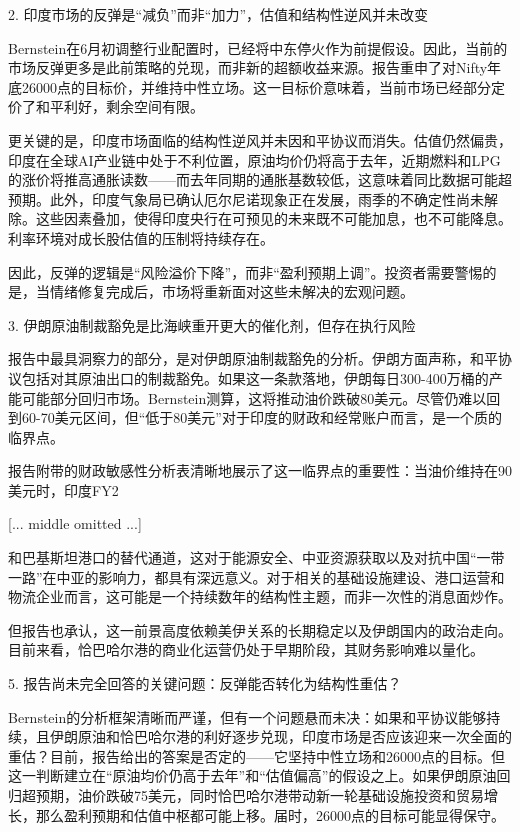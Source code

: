 \documentclass[11pt]{ctexart}
\begin{document}
2. 印度市场的反弹是“减负”而非“加力”，估值和结构性逆风并未改变

Bernstein在6月初调整行业配置时，已经将中东停火作为前提假设。因此，当前的市场反弹更多是此前策略的兑现，而非新的超额收益来源。报告重申了对Nifty年底26000点的目标价，并维持中性立场。这一目标价意味着，当前市场已经部分定价了和平利好，剩余空间有限。

更关键的是，印度市场面临的结构性逆风并未因和平协议而消失。估值仍然偏贵，印度在全球AI产业链中处于不利位置，原油均价仍将高于去年，近期燃料和LPG的涨价将推高通胀读数——而去年同期的通胀基数较低，这意味着同比数据可能超预期。此外，印度气象局已确认厄尔尼诺现象正在发展，雨季的不确定性尚未解除。这些因素叠加，使得印度央行在可预见的未来既不可能加息，也不可能降息。利率环境对成长股估值的压制将持续存在。

因此，反弹的逻辑是“风险溢价下降”，而非“盈利预期上调”。投资者需要警惕的是，当情绪修复完成后，市场将重新面对这些未解决的宏观问题。

3. 伊朗原油制裁豁免是比海峡重开更大的催化剂，但存在执行风险

报告中最具洞察力的部分，是对伊朗原油制裁豁免的分析。伊朗方面声称，和平协议包括对其原油出口的制裁豁免。如果这一条款落地，伊朗每日300-400万桶的产能可能部分回归市场。Bernstein测算，这将推动油价跌破80美元。尽管仍难以回到60-70美元区间，但“低于80美元”对于印度的财政和经常账户而言，是一个质的临界点。

报告附带的财政敏感性分析表清晰地展示了这一临界点的重要性：当油价维持在90美元时，印度FY2

[... middle omitted ...]

和巴基斯坦港口的替代通道，这对于能源安全、中亚资源获取以及对抗中国“一带一路”在中亚的影响力，都具有深远意义。对于相关的基础设施建设、港口运营和物流企业而言，这可能是一个持续数年的结构性主题，而非一次性的消息面炒作。

但报告也承认，这一前景高度依赖美伊关系的长期稳定以及伊朗国内的政治走向。目前来看，恰巴哈尔港的商业化运营仍处于早期阶段，其财务影响难以量化。

5. 报告尚未完全回答的关键问题：反弹能否转化为结构性重估？

Bernstein的分析框架清晰而严谨，但有一个问题悬而未决：如果和平协议能够持续，且伊朗原油和恰巴哈尔港的利好逐步兑现，印度市场是否应该迎来一次全面的重估？目前，报告给出的答案是否定的——它坚持中性立场和26000点的目标。但这一判断建立在“原油均价仍高于去年”和“估值偏高”的假设之上。如果伊朗原油回归超预期，油价跌破75美元，同时恰巴哈尔港带动新一轮基础设施投资和贸易增长，那么盈利预期和估值中枢都可能上移。届时，26000点的目标可能显得保守。
\end{document}
